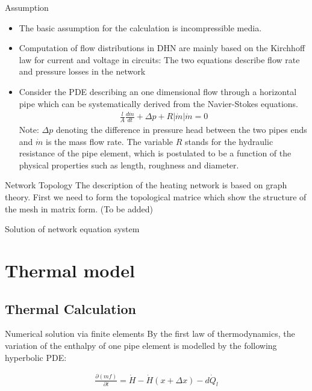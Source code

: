 \documentclass[xcolor=dvipsnames]{beamer}
\begin{document}
{\begin{frame}{Assumption}
\begin{itemize}
	\item 	The basic assumption for the calculation is incompressible media.
	\item 	Computation of flow distributions in DHN are mainly based on the Kirchhoff law for {\color{red}current} and {\color{blue}voltage} in circuits: The two equations describe {\color{red}flow rate} and {\color{blue}pressure losses} in the network
	\item 	Consider the PDE describing an one dimensional flow through a horizontal pipe which can be systematically derived from the Navier-Stokes equations.
\begin{align}
	\frac{l}{A}\frac{d\dot{m}}{dt}+\Delta p+R|\dot{m}|\dot{m}=0
\end{align}
Note: $\Delta p$ denoting the difference in pressure head between the two pipes ends and $\dot{m}$ is the mass flow rate. The variable $R$ stands for the hydraulic resistance of the pipe element, which is postulated to be a function of the physical properties such as length, roughness and diameter.
\end{itemize}
\end{frame}

\begin{frame}{Network Topology}
The description of the heating network is based on graph theory. First we need to form the topological matrice which show the structure of the mesh in matrix form. (To be added)


\end{frame}

\begin{frame}{Solution of network equation system}

\end{frame}
}

\section{Thermal model}

\subsection{Thermal Calculation}

\begin{frame}{Numerical solution via finite elements}
	By the first law of thermodynamics, the variation of the enthalpy of one pipe element is modelled by the
	following hyperbolic PDE:

	\begin{align}
		\frac{\partial(mf)}{\partial t}=\dot{H}-\dot{H}(x+\Delta x)-d\dot{Q}_l
	\end{align}
\end{frame}
\end{document}
